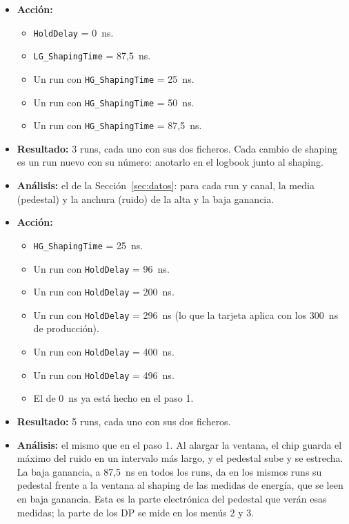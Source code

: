 \documentclass[11pt,a4paper]{article}
\begin{document}
\begin{itemize}
\item {\bf Acción:}
  \begin{itemize}
  \item \texttt{HoldDelay} = 0~ns.
  \item \texttt{LG\_ShapingTime} = 87,5~ns.
  \item Un run con \texttt{HG\_ShapingTime} = 25~ns.
  \item Un run con \texttt{HG\_ShapingTime} = 50~ns.
  \item Un run con \texttt{HG\_ShapingTime} = 87,5~ns.
  \end{itemize}
\item {\bf Resultado:} 3 runs, cada uno con sus dos ficheros. Cada cambio
  de shaping es un run nuevo con su número: anotarlo en el logbook junto al
  shaping.
\item {\bf Análisis:} el de la Sección~\ref{sec:datos}: para cada run y
  canal, la media (pedestal) y la anchura (ruido) de la alta y la baja
  ganancia.
\end{itemize}

\begin{itemize}
\item {\bf Acción:}
  \begin{itemize}
  \item \texttt{HG\_ShapingTime} = 25~ns.
  \item Un run con \texttt{HoldDelay} = 96~ns.
  \item Un run con \texttt{HoldDelay} = 200~ns.
  \item Un run con \texttt{HoldDelay} = 296~ns (lo que la tarjeta aplica con
    los 300~ns de producción).
  \item Un run con \texttt{HoldDelay} = 400~ns.
  \item Un run con \texttt{HoldDelay} = 496~ns.
  \item El de 0~ns ya está hecho en el paso 1.
  \end{itemize}
\item {\bf Resultado:} 5 runs, cada uno con sus dos ficheros.
\item {\bf Análisis:} el mismo que en el paso 1. Al alargar la ventana, el
  chip guarda el máximo del ruido en un intervalo más largo, y el pedestal
  sube y se estrecha. La baja ganancia, a 87,5~ns en todos los runs, da en
  los mismos runs su pedestal frente a la ventana al shaping de las medidas
  de energía, que se leen en baja ganancia. Esta es la parte electrónica del
  pedestal que verán esas medidas; la parte de los DP se mide en los menús 2
  y 3.
\end{itemize}
\end{document}
